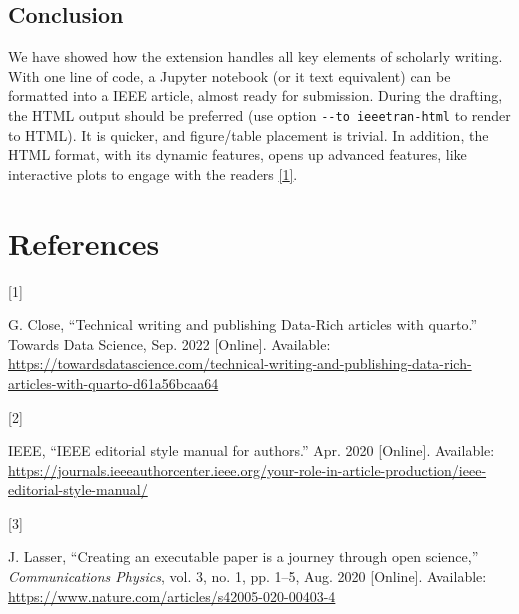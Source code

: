 \documentclass[letterpaper, 10 pt, journal, twoside]{IEEEtran}
\newlength{\cslhangindent}
\newlength{\csllabelwidth}
\newlength{\cslentryspacingunit} %
\newenvironment{CSLReferences}[2] %
 {%
  \setlength{\parindent}{0pt}
  \ifodd #1
  \let\oldpar\par
  \def\par{\hangindent=\cslhangindent\oldpar}
  \fi
  \setlength{\parskip}{#2\cslentryspacingunit}
 }%
 {}
\newcommand{\CSLLeftMargin}[1]{\parbox[t]{\csllabelwidth}{#1}}
\newcommand{\CSLRightInline}[1]{\parbox[t]{\linewidth - \csllabelwidth}{#1}\break}
\begin{document}
\hypertarget{conclusion}{%
\subsection{Conclusion}\label{conclusion}}

We have showed how the extension handles all key elements of scholarly
writing. With one line of code, a Jupyter notebook (or it text
equivalent) can be formatted into a IEEE article, almost ready for
submission. During the drafting, the HTML output should be preferred
(use option \texttt{-\/-to\ ieeetran-html} to render to HTML). It is
quicker, and figure/table placement is trivial. In addition, the HTML
format, with its dynamic features, opens up advanced features, like
interactive plots to engage with the readers
\protect\hyperlink{ref-Close2022-dt}{{[}1{]}}.

\hypertarget{bibliography}{%
\section*{References}\label{bibliography}}

\hypertarget{refs}{}
\begin{CSLReferences}{0}{0}
\leavevmode{}%
\CSLLeftMargin{{[}1{]} }%
\CSLRightInline{G. Close, {``Technical writing and publishing
{Data-Rich} articles with quarto.''} Towards Data Science, Sep. 2022
{[}Online{]}. Available:
\url{https://towardsdatascience.com/technical-writing-and-publishing-data-rich-articles-with-quarto-d61a56bcaa64}}

\leavevmode{}%
\CSLLeftMargin{{[}2{]} }%
\CSLRightInline{IEEE, {``{IEEE} editorial style manual for authors.''}
Apr. 2020 {[}Online{]}. Available:
\url{https://journals.ieeeauthorcenter.ieee.org/your-role-in-article-production/ieee-editorial-style-manual/}}

\leavevmode{}%
\CSLLeftMargin{{[}3{]} }%
\CSLRightInline{J. Lasser, {``Creating an executable paper is a journey
through open science,''} \emph{Communications Physics}, vol. 3, no. 1,
pp. 1--5, Aug. 2020 {[}Online{]}. Available:
\url{https://www.nature.com/articles/s42005-020-00403-4}}

\end{CSLReferences}

\end{document}
